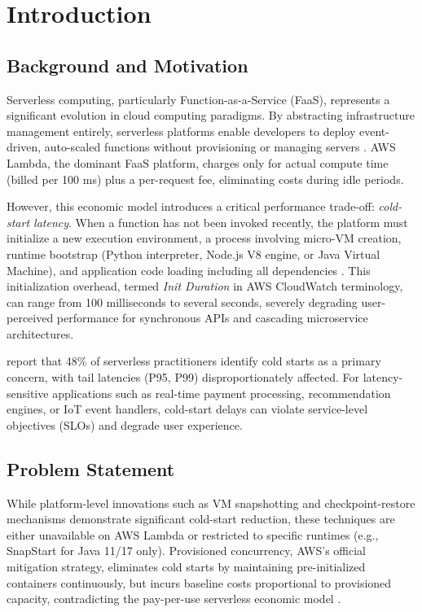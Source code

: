 \chapter{Introduction}
\label{ch:introduction}

\section{Background and Motivation}

Serverless computing, particularly Function-as-a-Service (FaaS), represents a significant evolution in cloud computing paradigms. By abstracting infrastructure management entirely, serverless platforms enable developers to deploy event-driven, auto-scaled functions without provisioning or managing servers \citep{shafiei2022survey}. AWS Lambda, the dominant FaaS platform, charges only for actual compute time (billed per 100 ms) plus a per-request fee, eliminating costs during idle periods.

However, this economic model introduces a critical performance trade-off: \textit{cold-start latency}. When a function has not been invoked recently, the platform must initialize a new execution environment, a process involving micro-VM creation, runtime bootstrap (Python interpreter, Node.js V8 engine, or Java Virtual Machine), and application code loading including all dependencies \citep{golec2024coldstart}. This initialization overhead, termed \textit{Init Duration} in AWS CloudWatch terminology, can range from 100 milliseconds to several seconds, severely degrading user-perceived performance for synchronous APIs and cascading microservice architectures.

\citet{eismann2022state} report that 48\% of serverless practitioners identify cold starts as a primary concern, with tail latencies (P95, P99) disproportionately affected. For latency-sensitive applications such as real-time payment processing, recommendation engines, or IoT event handlers, cold-start delays can violate service-level objectives (SLOs) and degrade user experience.

\section{Problem Statement}

While platform-level innovations such as VM snapshotting \citep{ao2022faasnap} and checkpoint-restore mechanisms \citep{kohli2024pronghorn} demonstrate significant cold-start reduction, these techniques are either unavailable on AWS Lambda or restricted to specific runtimes (e.g., SnapStart for Java 11/17 only). Provisioned concurrency, AWS's official mitigation strategy, eliminates cold starts by maintaining pre-initialized containers continuously, but incurs baseline costs proportional to provisioned capacity, contradicting the pay-per-use serverless economic model \citep{shafiei2022survey}.

